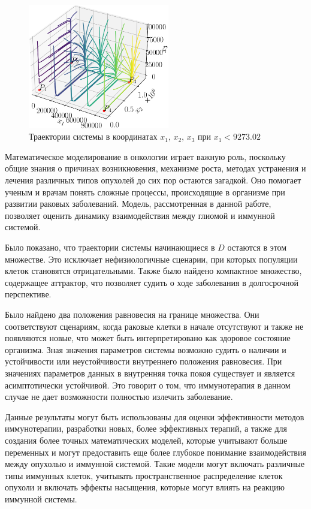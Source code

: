 \documentclass[14pt,a4paper]{extarticle}
\begin{document}
\begin{example}
		\begin{figure}[h]
			\centering
			\includegraphics[width=0.55\textwidth]{media/Figure_16.png}
			\caption{Траектории системы в координатах $x_1,\, x_2,\, x_3$ при $x_1 < 9273.02$}
			\label{fig:model_K5_new}
		\end{figure}
	\end{example}
	
	\begin{conclusion}
	Математическое моделирование в онкологии играет важную роль, поскольку общие знания о причинах возникновения, механизме роста, методах устранения и лечения различных типов опухолей до сих пор остаются загадкой. Оно помогает ученым и врачам понять сложные процессы, происходящие в организме при развитии раковых заболеваний. Модель, рассмотренная в данной работе, позволяет оценить динамику взаимодействия между глиомой и иммунной системой.
	
	Было показано, что траектории системы начинающиеся в $D$ остаются в этом множестве. Это исключает нефизиологичные сценарии, при которых популяции клеток становятся отрицательными. Также было найдено компактное множество, содержащее аттрактор, что позволяет судить о ходе заболевания в долгосрочной перспективе.
	
	Было найдено два положения равновесия на границе множества. Они соответствуют сценариям, когда раковые клетки в начале отсутствуют и также не появляются новые, что может быть интерпретировано как здоровое состояние организма. Зная значения параметров системы возможно судить о наличии и устойчивости или неустойчивости внутреннего положения равновесия. При значениях параметров данных в \cite{model_params} внутренняя точка покоя существует и является асимптотически устойчивой. Это говорит о том, что иммунотерапия в данном случае не дает возможности полностью излечить заболевание. 
	
	Данные результаты могут быть использованы для оценки эффективности методов иммунотерапии, разработки новых, более эффективных терапий, а также для создания более точных математических моделей, которые учитывают больше переменных и могут предоставить еще более глубокое понимание взаимодействия между опухолью и иммунной системой. Такие модели могут включать различные типы иммунных клеток, учитывать пространственное распределение клеток опухоли и включать эффекты насыщения, которые могут влиять на реакцию иммунной системы.
	\end{conclusion}
	
\end{document}
